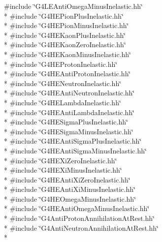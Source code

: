 {\ttfamily \#include \char`\"{}G4\-L\-E\-Anti\-Omega\-Minus\-Inelastic.\-hh\char`\"{}}\\*
{\ttfamily \#include \char`\"{}G4\-H\-E\-Pion\-Plus\-Inelastic.\-hh\char`\"{}}\\*
{\ttfamily \#include \char`\"{}G4\-H\-E\-Pion\-Minus\-Inelastic.\-hh\char`\"{}}\\*
{\ttfamily \#include \char`\"{}G4\-H\-E\-Kaon\-Plus\-Inelastic.\-hh\char`\"{}}\\*
{\ttfamily \#include \char`\"{}G4\-H\-E\-Kaon\-Zero\-Inelastic.\-hh\char`\"{}}\\*
{\ttfamily \#include \char`\"{}G4\-H\-E\-Kaon\-Minus\-Inelastic.\-hh\char`\"{}}\\*
{\ttfamily \#include \char`\"{}G4\-H\-E\-Proton\-Inelastic.\-hh\char`\"{}}\\*
{\ttfamily \#include \char`\"{}G4\-H\-E\-Anti\-Proton\-Inelastic.\-hh\char`\"{}}\\*
{\ttfamily \#include \char`\"{}G4\-H\-E\-Neutron\-Inelastic.\-hh\char`\"{}}\\*
{\ttfamily \#include \char`\"{}G4\-H\-E\-Anti\-Neutron\-Inelastic.\-hh\char`\"{}}\\*
{\ttfamily \#include \char`\"{}G4\-H\-E\-Lambda\-Inelastic.\-hh\char`\"{}}\\*
{\ttfamily \#include \char`\"{}G4\-H\-E\-Anti\-Lambda\-Inelastic.\-hh\char`\"{}}\\*
{\ttfamily \#include \char`\"{}G4\-H\-E\-Sigma\-Plus\-Inelastic.\-hh\char`\"{}}\\*
{\ttfamily \#include \char`\"{}G4\-H\-E\-Sigma\-Minus\-Inelastic.\-hh\char`\"{}}\\*
{\ttfamily \#include \char`\"{}G4\-H\-E\-Anti\-Sigma\-Plus\-Inelastic.\-hh\char`\"{}}\\*
{\ttfamily \#include \char`\"{}G4\-H\-E\-Anti\-Sigma\-Minus\-Inelastic.\-hh\char`\"{}}\\*
{\ttfamily \#include \char`\"{}G4\-H\-E\-Xi\-Zero\-Inelastic.\-hh\char`\"{}}\\*
{\ttfamily \#include \char`\"{}G4\-H\-E\-Xi\-Minus\-Inelastic.\-hh\char`\"{}}\\*
{\ttfamily \#include \char`\"{}G4\-H\-E\-Anti\-Xi\-Zero\-Inelastic.\-hh\char`\"{}}\\*
{\ttfamily \#include \char`\"{}G4\-H\-E\-Anti\-Xi\-Minus\-Inelastic.\-hh\char`\"{}}\\*
{\ttfamily \#include \char`\"{}G4\-H\-E\-Omega\-Minus\-Inelastic.\-hh\char`\"{}}\\*
{\ttfamily \#include \char`\"{}G4\-H\-E\-Anti\-Omega\-Minus\-Inelastic.\-hh\char`\"{}}\\*
{\ttfamily \#include \char`\"{}G4\-Anti\-Proton\-Annihilation\-At\-Rest.\-hh\char`\"{}}\\*
{\ttfamily \#include \char`\"{}G4\-Anti\-Neutron\-Annihilation\-At\-Rest.\-hh\char`\"{}}\\*
